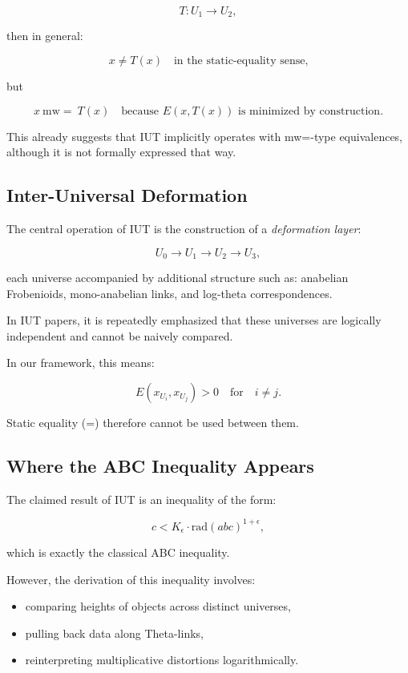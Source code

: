 \documentclass[11pt]{article}
\begin{document}
\[
T : U_1 \to U_2,
\]

then in general:

\[
x \ne T(x)
\quad\text{in the static-equality sense,}
\]

but

\[
x \ \mathrm{mw=} \ T(x)
\quad\text{because } E(x, T(x)) \text{ is minimized by construction}.
\]

This already suggests that IUT implicitly operates with mw=-type
equivalences, although it is not formally expressed that way.

\subsection{Inter-Universal Deformation}

The central operation of IUT is the construction of a
\emph{deformation layer}:

\[
U_0 \longrightarrow U_1 \longrightarrow U_2 \longrightarrow U_3,
\]

each universe accompanied by additional structure such as:
anabelian Frobenioids, mono-anabelian links, and log-theta correspondences.

In IUT papers, it is repeatedly emphasized that these universes are
logically independent and cannot be naively compared.

In our framework, this means:

\[
E(x_{U_i}, x_{U_j}) > 0 \quad\text{for}\quad i \ne j.
\]

Static equality (=) therefore cannot be used between them.

\subsection{Where the ABC Inequality Appears}

The claimed result of IUT is an inequality of the form:

\[
c < K_{\epsilon} \cdot \mathrm{rad}(abc)^{1+\epsilon},
\]

which is exactly the classical ABC inequality.

However, the derivation of this inequality involves:

\begin{itemize}
\item comparing heights of objects across distinct universes,
\item pulling back data along Theta-links,
\item reinterpreting multiplicative distortions logarithmically.
\end{itemize}
\end{document}
